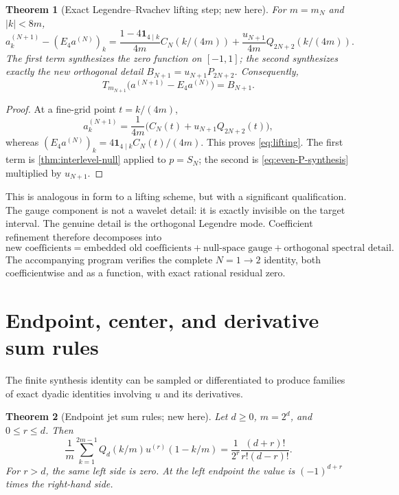 \documentclass[11pt,oneside]{article}
\numberwithin{equation}{section}
\newtheorem{theorem}{Theorem}[section]
\theoremstyle{definition}
\theoremstyle{remark}
\newcommand{\one}{\mathbf 1}
\begin{document}
\begin{theorem}[Exact Legendre--Rvachev lifting step; new here]
\label{thm:lifting}
For $m=m_N$ and $|k|<8m$,
\begin{equation}
 \boxed{
 a_k^{(N+1)}-(E_4a^{(N)})_k
 =\frac{1-4\one_{4\mid k}}{4m}C_N(k/(4m))
 +\frac{u_{N+1}}{4m}Q_{2N+2}(k/(4m)).}
 \label{eq:lifting}
\end{equation}
The first term synthesizes the zero function on $[-1,1]$; the second
synthesizes exactly the new orthogonal detail $B_{N+1}=u_{N+1}P_{2N+2}$.
Consequently,
\begin{equation}
 T_{m_{N+1}}\bigl(a^{(N+1)}-E_4a^{(N)}\bigr)=B_{N+1}.
 \label{eq:lifting-function}
\end{equation}
\end{theorem}

\begin{proof}
At a fine-grid point $t=k/(4m)$,
\[
 a_k^{(N+1)}=\frac1{4m}
 \bigl(C_N(t)+u_{N+1}Q_{2N+2}(t)\bigr),
\]
whereas $(E_4a^{(N)})_k=4\one_{4\mid k}C_N(t)/(4m)$.
This proves \eqref{eq:lifting}.  The first term is
\cref{thm:interlevel-null} applied to $p=S_N$; the second is
\eqref{eq:even-P-synthesis} multiplied by $u_{N+1}$.
\end{proof}

This is analogous in form to a lifting scheme, but with a significant
qualification.  The gauge component is not a wavelet detail: it is exactly
invisible on the target interval.  The genuine detail is the orthogonal
Legendre mode.  Coefficient refinement therefore decomposes into
\[
 \text{new coefficients}
 =\text{embedded old coefficients}
 +\text{null-space gauge}
 +\text{orthogonal spectral detail}.
\]
The accompanying program verifies the complete $N=1\to2$ identity, both
coefficientwise and as a function, with exact rational residual zero.

\section{Endpoint, center, and derivative sum rules}
\label{sec:sum-rules}

The finite synthesis identity can be sampled or differentiated to produce
families of exact dyadic identities involving $u$ and its derivatives.

\begin{theorem}[Endpoint jet sum rules; new here]
\label{thm:endpoint-jets}
Let $d\ge0$, $m=2^d$, and $0\le r\le d$.  Then
\begin{equation}
 \boxed{
 \frac1m\sum_{k=1}^{2m-1}Q_d(k/m)
 u^{(r)}(1-k/m)
 =\frac1{2^r}\frac{(d+r)!}{r!(d-r)!}.}
 \label{eq:endpoint-jets}
\end{equation}
For $r>d$, the same left side is zero.  At the left endpoint the value is
$(-1)^{d+r}$ times the right-hand side.
\end{theorem}
\end{document}
